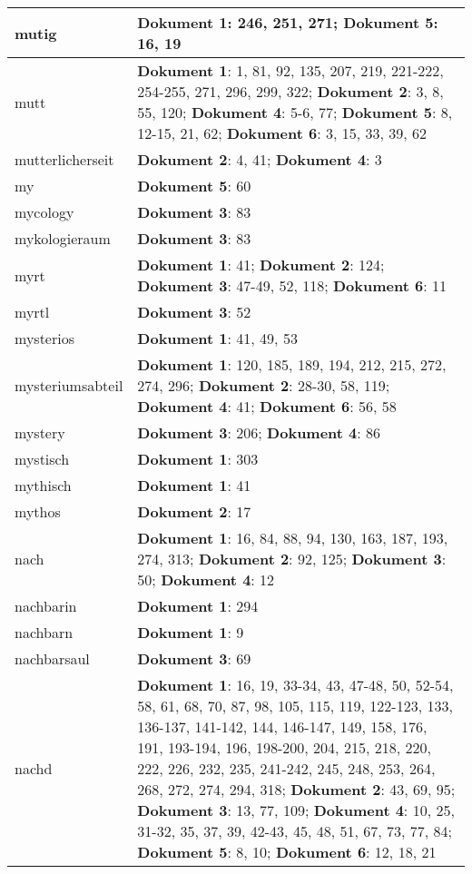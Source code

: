 \documentclass[a5paper]{article}
\begin{document}
\begin{longtable}[l]{|l|p{3in}|}
\hline
mutig & \textbf{Dokument 1}: 246, 251, 271; \textbf{Dokument 5}: 16, 19 \\
\hline
mutt & \textbf{Dokument 1}: 1, 81, 92, 135, 207, 219, 221-222, 254-255, 271, 296, 299, 322; \textbf{Dokument 2}: 3, 8, 55, 120; \textbf{Dokument 4}: 5-6, 77; \textbf{Dokument 5}: 8, 12-15, 21, 62; \textbf{Dokument 6}: 3, 15, 33, 39, 62 \\
\hline
mutterlicherseit & \textbf{Dokument 2}: 4, 41; \textbf{Dokument 4}: 3 \\
\hline
my & \textbf{Dokument 5}: 60 \\
\hline
mycology & \textbf{Dokument 3}: 83 \\
\hline
mykologieraum & \textbf{Dokument 3}: 83 \\
\hline
myrt & \textbf{Dokument 1}: 41; \textbf{Dokument 2}: 124; \textbf{Dokument 3}: 47-49, 52, 118; \textbf{Dokument 6}: 11 \\
\hline
myrtl & \textbf{Dokument 3}: 52 \\
\hline
mysterios & \textbf{Dokument 1}: 41, 49, 53 \\
\hline
mysteriumsabteil & \textbf{Dokument 1}: 120, 185, 189, 194, 212, 215, 272, 274, 296; \textbf{Dokument 2}: 28-30, 58, 119; \textbf{Dokument 4}: 41; \textbf{Dokument 6}: 56, 58 \\
\hline
mystery & \textbf{Dokument 3}: 206; \textbf{Dokument 4}: 86 \\
\hline
mystisch & \textbf{Dokument 1}: 303 \\
\hline
mythisch & \textbf{Dokument 1}: 41 \\
\hline
mythos & \textbf{Dokument 2}: 17 \\
\hline
nach & \textbf{Dokument 1}: 16, 84, 88, 94, 130, 163, 187, 193, 274, 313; \textbf{Dokument 2}: 92, 125; \textbf{Dokument 3}: 50; \textbf{Dokument 4}: 12 \\
\hline
nachbarin & \textbf{Dokument 1}: 294 \\
\hline
nachbarn & \textbf{Dokument 1}: 9 \\
\hline
nachbarsaul & \textbf{Dokument 3}: 69 \\
\hline
nachd & \textbf{Dokument 1}: 16, 19, 33-34, 43, 47-48, 50, 52-54, 58, 61, 68, 70, 87, 98, 105, 115, 119, 122-123, 133, 136-137, 141-142, 144, 146-147, 149, 158, 176, 191, 193-194, 196, 198-200, 204, 215, 218, 220, 222, 226, 232, 235, 241-242, 245, 248, 253, 264, 268, 272, 274, 294, 318; \textbf{Dokument 2}: 43, 69, 95; \textbf{Dokument 3}: 13, 77, 109; \textbf{Dokument 4}: 10, 25, 31-32, 35, 37, 39, 42-43, 45, 48, 51, 67, 73, 77, 84; \textbf{Dokument 5}: 8, 10; \textbf{Dokument 6}: 12, 18, 21 \\

\end{longtable}
\end{document}
